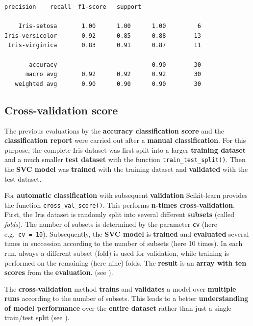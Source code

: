 \documentclass [oneside,10pt,a4paper,ngerman,BCOR10mm,headsepline,parindent,final]{scrartcl}
\begin{document}
    \begin{Verbatim}[commandchars=\\\{\}]
                 precision    recall  f1-score   support

    Iris-setosa       1.00      1.00      1.00         6
Iris-versicolor       0.92      0.85      0.88        13
 Iris-virginica       0.83      0.91      0.87        11

       accuracy                           0.90        30
      macro avg       0.92      0.92      0.92        30
   weighted avg       0.90      0.90      0.90        30

    \end{Verbatim}

    \hypertarget{cross-validation-score}{%
\subsection{Cross-validation score}\label{cross-validation-score}}

The previous evaluations by the \textbf{accuracy classification score}
and the \textbf{classification report} were carried out after a
\textbf{manual classification}. For this purpose, the complete Iris
dataset was first split into a larger \textbf{training dataset} and a
much smaller \textbf{test dataset} with the function
\texttt{train\_test\_split()}. Then the \textbf{SVC model} was
\textbf{trained} with the training dataset and \textbf{validated} with
the test dataset.

For \textbf{automatic classification} with subsequent
\textbf{validation} Scikit-learn provides the function
\texttt{cross\_val\_score()}. This performs \textbf{n-times
cross-validation}. First, the Iris dataset is randomly split into
several different \textbf{subsets} (called \emph{folds}). The number of
subsets is determined by the parameter \texttt{cv} (here
e.g.~\texttt{cv\ =\ 10}). Subsequently, the \textbf{SVC model} is
\textbf{trained} and \textbf{evaluated} several times in succession
according to the number of subsets (here 10 times). In each run, always
a different subset (fold) is used for validation, while training is
performed on the remaining (here nine) folds. The \textbf{result} is an
\textbf{array with ten scores} from the \textbf{evaluation}. (see
\cite{Geron_2018}).

The \textbf{cross-validation} method \textbf{trains} and
\textbf{validates} a model over \textbf{multiple runs} according to the
number of subsets. This leads to a better \textbf{understanding of model
performance} over the \textbf{entire dataset} rather than just a single
train/test split (see \cite{cross_val_score_2022}).
\end{document}

